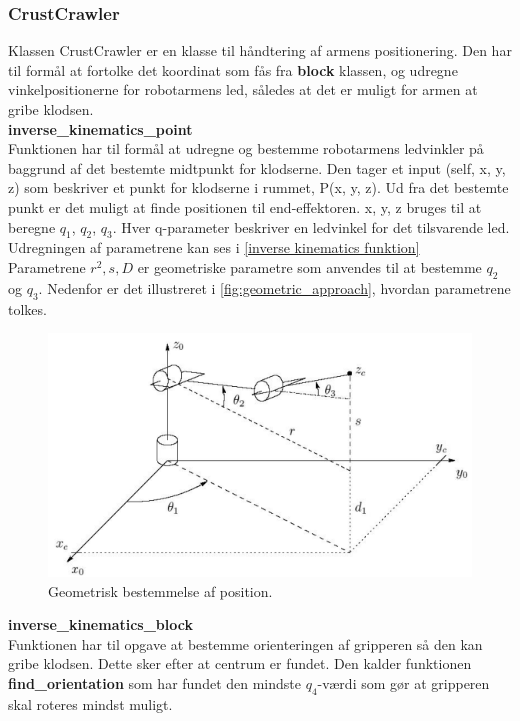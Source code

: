 \subsubsection{CrustCrawler}
\label{subsub: CrustCrawler}

Klassen CrustCrawler er en klasse til håndtering af armens positionering. Den har til formål at fortolke det koordinat som fås fra \textbf{block} klassen, og udregne vinkelpositionerne for robotarmens led, således at det er muligt for armen at gribe klodsen.\\

\textbf{inverse\_kinematics\_point}\\
Funktionen har til formål at udregne og bestemme robotarmens ledvinkler på baggrund af det bestemte midtpunkt for klodserne. Den tager et input (self, x, y, z) som beskriver et punkt for klodserne i rummet, P(x, y, z). Ud fra det bestemte punkt er det muligt at finde positionen til end-effektoren. x, y, z bruges til at beregne $q_1$, $q_2$, $q_3$. Hver q-parameter beskriver en ledvinkel for det tilsvarende led. Udregningen af parametrene kan ses i \autoref{inverse kinematics funktion}\\

Parametrene $r^2, s, D$ er geometriske parametre som anvendes til at bestemme $q_2$ og $q_3$. Nedenfor er det illustreret i \autoref{fig:geometric_approach}, hvordan parametrene tolkes.\\

\begin{figure}[h]
\centering
\includegraphics[scale=0.4]{images/geometric_approach}
\caption{Geometrisk bestemmelse af position.}
\label{fig:geometric_approach}
\end{figure}

\newpage
\textbf{inverse\_kinematics\_block}\\
Funktionen har til opgave at bestemme orienteringen af gripperen så den kan gribe klodsen. Dette sker efter at centrum er fundet. Den kalder funktionen \textbf{find\_orientation} som har fundet den mindste $q_4$-værdi som gør at gripperen skal roteres mindst muligt.

